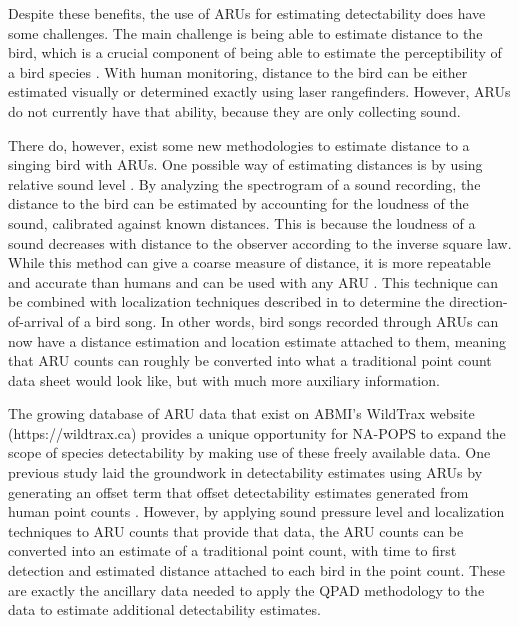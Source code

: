 \par Despite these benefits, the use of ARUs for estimating detectability does have some challenges. 
The main challenge is being able to estimate distance to the bird, which is a crucial component of being able to estimate the perceptibility of a bird species \citep{buckland_distance_2015}.
With human monitoring, distance to the bird can be either estimated visually or determined exactly using laser rangefinders.
However, ARUs do not currently have that ability, because they are only collecting sound. 

\par There do, however, exist some new methodologies to estimate distance to a singing bird with ARUs.
One possible way of estimating distances is by using relative sound level \citep{sebastian-gonzalez_density_2018, yip_sound_2017}.
By analyzing the spectrogram of a sound recording, the distance to the bird can be estimated by accounting for the loudness of the sound, calibrated against known distances.
This is because the loudness of a sound decreases with distance to the observer according to the inverse square law.
While this method can give a coarse measure of distance, it is more repeatable and accurate than humans and can be used with any ARU \citep{yip_sound_2020}.
This technique can be combined with localization techniques described in \cite{hedley_direction--arrival_2017} to determine the direction-of-arrival of a bird song.
In other words, bird songs recorded through ARUs can now have a distance estimation and location estimate attached to them, meaning that ARU counts can roughly be converted into what a traditional point count data sheet would look like, but with much more auxiliary information. 

\par The growing database of ARU data that exist on ABMI’s WildTrax website (https://wildtrax.ca) provides a unique opportunity for NA-POPS to expand the scope of species detectability by making use of these freely available data.
One previous study laid the groundwork in detectability estimates using ARUs by generating an offset term that offset detectability estimates generated from human point counts \citep{van_wilgenburg_paired_2017}.
However, by applying sound pressure level and localization techniques to ARU counts that provide that data, the ARU counts can be converted into an estimate of a traditional point count, with time to first detection and estimated distance attached to each bird in the point count.
These are exactly the ancillary data needed to apply the QPAD methodology to the data to estimate additional detectability estimates. 

